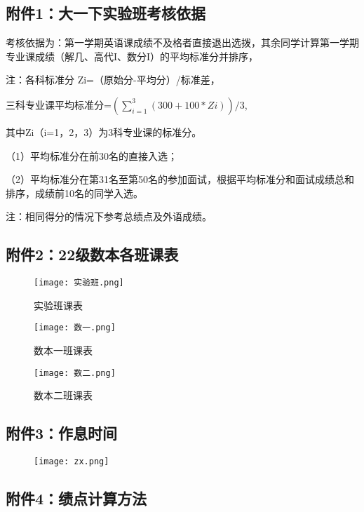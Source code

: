 \documentclass{my_paper}
\begin{document}
\subsection{附件1：大一下实验班考核依据}\label{f1}
考核依据为：第一学期英语课成绩不及格者直接退出选拨，其余同学计算第一学期专业课成绩（解几、高代I、数分I）的平均标准分并排序， 

注：各科标准分 Zi=（原始分-平均分）/标准差， 

三科专业课平均标准分=$(\sum_{i=1}^{3}(300+100*Zi))/3$,

其中Zi（i=1，2，3）为3科专业课的标准分。

（1）平均标准分在前30名的直接入选；
   
（2）平均标准分在第31名至第50名的参加面试，根据平均标准分和面试成绩总和排序，成绩前10名的同学入选。

注：相同得分的情况下参考总绩点及外语成绩。

\newpage

\subsection{附件2：22级数本各班课表}

\begin{figure}[H]
	\centering
	\texttt{[image: 实验班.png]}
	\caption{实验班课表}
\end{figure} 

\begin{figure}[H]
	\centering
	\texttt{[image: 数一.png]}
	\caption{数本一班课表}
\end{figure} 

\begin{figure}[htbp]
	\centering
	\texttt{[image: 数二.png]}
	\caption{数本二班课表}
\end{figure}

\newpage

\subsection{附件3：作息时间}
\begin{figure}[H]
	\centering
	\texttt{[image: zx.png]}
\end{figure} 

\subsection{附件4：绩点计算方法}
\end{document}

